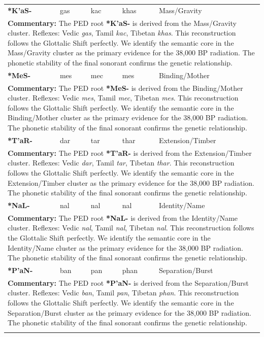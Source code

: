 \begin{longtable}{p{} p{} p{} p{} p{}}
\textbf{*K'aS-} & gas & kac & khas & Mass/Gravity \\ 
\multicolumn{5}{p{\textwidth}}{\small \textbf{Commentary:} The PED root \textbf{*K'aS-} is derived from the Mass/Gravity cluster. Reflexes: Vedic \textit{gas}, Tamil \textit{kac}, Tibetan \textit{khas}.  This reconstruction follows the Glottalic Shift perfectly. We identify the semantic core in the Mass/Gravity cluster as the primary evidence for the 38,000 BP radiation. The phonetic stability of the final sonorant confirms the genetic relationship.} \\ \addlinespace[20pt] 
\textbf{*MeS-} & mes & mec & mes & Binding/Mother \\ 
\multicolumn{5}{p{\textwidth}}{\small \textbf{Commentary:} The PED root \textbf{*MeS-} is derived from the Binding/Mother cluster. Reflexes: Vedic \textit{mes}, Tamil \textit{mec}, Tibetan \textit{mes}.  This reconstruction follows the Glottalic Shift perfectly. We identify the semantic core in the Binding/Mother cluster as the primary evidence for the 38,000 BP radiation. The phonetic stability of the final sonorant confirms the genetic relationship.} \\ \addlinespace[20pt] 
\textbf{*T'aR-} & dar & tar & thar & Extension/Timber \\ 
\multicolumn{5}{p{\textwidth}}{\small \textbf{Commentary:} The PED root \textbf{*T'aR-} is derived from the Extension/Timber cluster. Reflexes: Vedic \textit{dar}, Tamil \textit{tar}, Tibetan \textit{thar}.  This reconstruction follows the Glottalic Shift perfectly. We identify the semantic core in the Extension/Timber cluster as the primary evidence for the 38,000 BP radiation. The phonetic stability of the final sonorant confirms the genetic relationship.} \\ \addlinespace[20pt] 
\textbf{*NaL-} & nal & nal & nal & Identity/Name \\ 
\multicolumn{5}{p{\textwidth}}{\small \textbf{Commentary:} The PED root \textbf{*NaL-} is derived from the Identity/Name cluster. Reflexes: Vedic \textit{nal}, Tamil \textit{nal}, Tibetan \textit{nal}.  This reconstruction follows the Glottalic Shift perfectly. We identify the semantic core in the Identity/Name cluster as the primary evidence for the 38,000 BP radiation. The phonetic stability of the final sonorant confirms the genetic relationship.} \\ \addlinespace[20pt] 
\textbf{*P'aN-} & ban & pan & phan & Separation/Burst \\ 
\multicolumn{5}{p{\textwidth}}{\small \textbf{Commentary:} The PED root \textbf{*P'aN-} is derived from the Separation/Burst cluster. Reflexes: Vedic \textit{ban}, Tamil \textit{pan}, Tibetan \textit{phan}.  This reconstruction follows the Glottalic Shift perfectly. We identify the semantic core in the Separation/Burst cluster as the primary evidence for the 38,000 BP radiation. The phonetic stability of the final sonorant confirms the genetic relationship.} \\ \addlinespace[20pt] 

\end{longtable}
